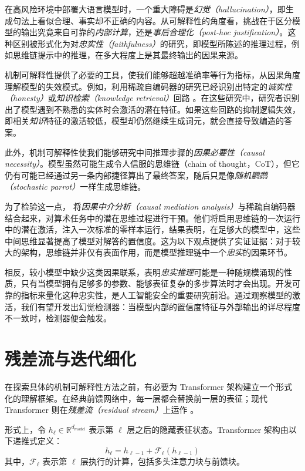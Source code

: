 在高风险环境中部署大语言模型时，一个重大障碍是\emph{幻觉（hallucination）}，即生成句法上看似合理、事实却不正确的内容。从可解释性的角度看，挑战在于区分模型的输出究竟来自可靠的\emph{内部计算}，还是\emph{事后合理化（post-hoc justification）}。这种区别被形式化为对\emph{忠实性（faithfulness）}的研究，即模型所陈述的推理过程，例如思维链提示中的推理，在多大程度上是其最终输出的因果来源。

机制可解释性提供了必要的工具，使我们能够超越准确率等行为指标，从因果角度理解模型的失效模式。例如，利用稀疏自编码器的研究已经识别出特定的\emph{诚实性（honesty）}或\emph{知识检索（knowledge retrieval）}回路 \citep{lindsey2025biology}。在这些研究中，研究者识别出了模型遇到不熟悉的实体时会激活的潜在特征。如果这些回路的抑制逻辑失效，即相关\emph{知识}特征的激活较低，模型却仍然继续生成词元，就会直接导致编造的答案。

此外，机制可解释性使我们能够研究中间推理步骤的\emph{因果必要性（causal necessity）}。模型虽然可能生成令人信服的思维链（chain of thought，CoT），但它仍有可能已经通过另一条内部捷径算出了最终答案，随后只是像\emph{随机鹦鹉（stochastic parrot）}一样生成思维链。

为了检验这一点，\citet{chen2025does} 将\emph{因果中介分析（causal mediation analysis）}与稀疏自编码器结合起来，对算术任务中的潜在思维过程进行干预。他们将启用思维链的一次运行中的潜在激活，注入一次标准的零样本运行，结果表明，在足够大的模型中，这些中间思维显著提高了模型对解答的置信度。这为以下观点提供了实证证据：对于较大的架构，思维链并非仅有表面作用，而是模型推理链中一个\emph{忠实}的因果环节。

相反，较小模型中缺少这类因果联系，表明\emph{忠实推理}可能是一种随规模涌现的性质，只有当模型拥有足够多的参数、能够表征复杂的多步算法时才会出现。开发可靠的指标来量化这种忠实性，是人工智能安全的重要研究前沿。通过观察模型的激活，我们有望开发出幻觉检测器：当模型内部的置信度特征与外部输出的详尽程度不一致时，检测器便会触发。

\section{残差流与迭代细化} \label{residualstream}

在探索具体的机制可解释性方法之前，有必要为 Transformer 架构建立一个形式化的理解框架。在经典前馈网络中，每一层都会替换前一层的表征；现代 Transformer 则在\textit{残差流（residual stream）}上运作 \citep{elhage2021mathematical}。

形式上，令 $h_\ell \in \mathbb{R}^{d_{model}}$ 表示第 $\ell$ 层之后的隐藏表征状态。Transformer 架构由以下递推式定义：
\begin{equation}
    h_\ell = h_{\ell-1} + \mathcal{F}_\ell(h_{\ell-1})
\end{equation}
其中，$\mathcal{F}_\ell$ 表示第 $\ell$ 层执行的计算，包括多头注意力块与前馈块。


